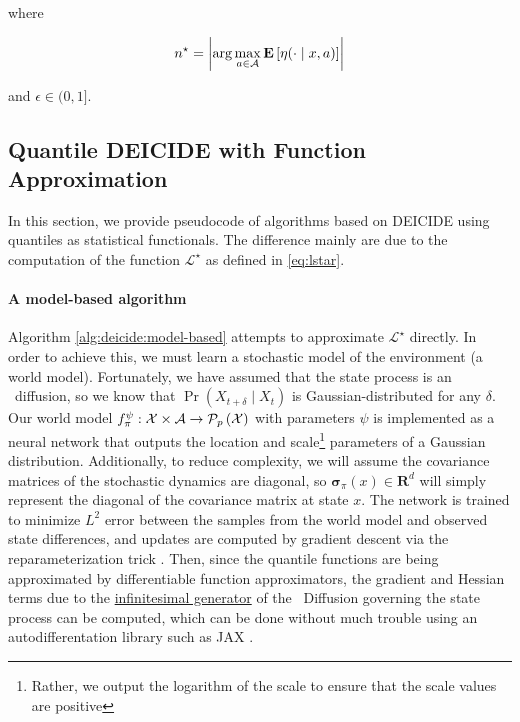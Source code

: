 where

\begin{align*}
  n^\star =
  \left\lvert\arg\max_{a\in\mathcal{A}}\underset{}{\mathbf{E}}\left[\operatorname{\eta}(\cdot\mid
  x, a)\right]\right\rvert
\end{align*}

and $\epsilon\in(0,1]$.

\subsection{Quantile DEICIDE with Function
  Approximation}\label{s:deicide:alg:algs}
In this section, we provide pseudocode of algorithms based on DEICIDE
using quantiles as statistical functionals. The difference mainly are
due to the computation of the function $\mathscr{L}^\star$ as defined
in \eqref{eq:lstar}.

\paragraph{A model-based algorithm}
Algorithm \ref{alg:deicide:model-based} attempts to approximate
$\mathscr{L}^\star$ directly. In order to achieve this, we must learn
a stochastic model of the environment (a world model). Fortunately, we
have assumed that the state process is an \Ito\ diffusion, so we know
that $\Pr(X_{t+\delta}\mid X_t)$ is Gaussian-distributed for any
$\delta$. Our world model
$f_\pi^\psi:\mathcal{X}\times\mathcal{A}\to\mathcal{P}_{p}\left(\mathcal{X}\right)$ with
parameters $\psi$ is implemented
as a neural network that outputs the location and
scale\footnote{Rather, we output the logarithm of the scale to ensure
  that the scale values are positive} parameters of a Gaussian
distribution. Additionally, to reduce complexity, we will assume the covariance
matrices of the stochastic dynamics are diagonal, so
$\pmb{\sigma}_\pi(x)\in\mathbf{R}^d$ will simply represent the diagonal of the
covariance matrix at state $x$. The network is trained to minimize $L^2$ error between
the samples from the world model and observed state differences, and
updates are computed by gradient descent via the reparameterization
trick \citep{kingma2013auto}. Then, since the quantile functions are
being approximated by differentiable function approximators, the
gradient and Hessian terms due to the
\hyperref[def:generator]{infinitesimal generator} of the \Ito\
Diffusion governing the state process can be computed, which can be
done without much trouble using an autodifferentation library such as
JAX \citep{jax2018github}.

